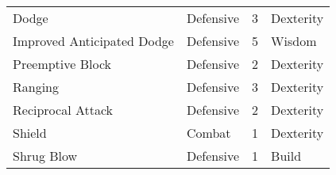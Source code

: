 \documentclass[twoside]{book}
\begin{document}
\begin{longtable}{p{1.25in}lll}
  \raggedright
           Dodge 
  &
   Defensive 
  &
   3 
  &
   Dexterity 
  \tabularnewline
      
  \raggedright
           Improved Anticipated Dodge
           
  &
   Defensive 
  &
   5 
  &
   Wisdom 
  \tabularnewline
      
  \raggedright
           Preemptive Block 
  &
   Defensive 
  &
   2 
  &
   Dexterity 
  \tabularnewline
      
  \raggedright
           Ranging 
  &
   Defensive 
  &
   3 
  &
   Dexterity 
  \tabularnewline
      
  \raggedright
           Reciprocal Attack 
  &
   Defensive 
  &
   2 
  &
   Dexterity 
  \tabularnewline
      
  \raggedright
           Shield 
  &
   Combat 
  &
   1 
  &
   Dexterity 
  \tabularnewline
      
  \raggedright
           Shrug Blow 
  &
   Defensive 
  &
   1 
  &
   Build 
  \tabularnewline
      
\end{longtable}
    
\end{document}
